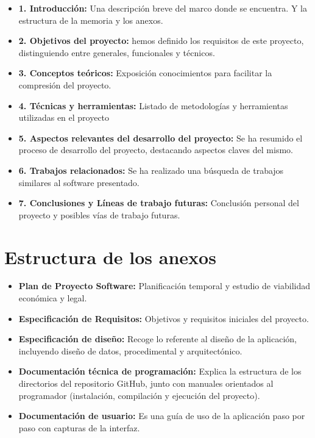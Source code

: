 \begin{itemize}
    \item \textbf{1. Introducción:} Una descripción breve del marco donde se encuentra. Y la estructura de la memoria y los anexos.
    \item \textbf{2. Objetivos del proyecto:} hemos definido los requisitos de este proyecto, distinguiendo entre generales, funcionales y técnicos.
    \item \textbf{3. Conceptos teóricos:} Exposición conocimientos para facilitar la compresión del proyecto.
    \item \textbf{4. Técnicas y herramientas:} Listado de metodologías y herramientas utilizadas en el proyecto
    \item \textbf{5. Aspectos relevantes del desarrollo del proyecto:} Se ha resumido el proceso de desarrollo del proyecto, destacando aspectos claves del mismo.
    \item \textbf{6. Trabajos relacionados:} Se ha realizado una búsqueda de trabajos similares al software presentado.
    \item \textbf{7. Conclusiones y Líneas de trabajo futuras:} Conclusión personal del proyecto y posibles vías de trabajo futuras.
\end{itemize}

\section{Estructura de los anexos}

\begin{itemize}
    \item \textbf{Plan de Proyecto Software:} Planificación temporal y estudio de viabilidad económica y legal.
    \item \textbf{Especificación de Requisitos:} Objetivos y requisitos iniciales del proyecto.
    \item \textbf{Especificación de diseño:} Recoge lo referente al diseño de la aplicación, incluyendo diseño de datos, procedimental y arquitectónico.
    \item \textbf{Documentación técnica de programación:} Explica la estructura de los directorios del repositorio GitHub, junto con manuales orientados al programador (instalación, compilación y ejecución del proyecto).
    \item \textbf{Documentación de usuario:} Es una guía de uso de la aplicación paso por paso con capturas de la interfaz.
\end{itemize}
